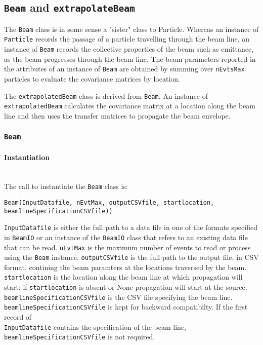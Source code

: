 \subsection{\texttt{Beam} and \texttt{extrapolateBeam}}
\label{SubSect:B}

The \texttt{Beam} class is in some sense a "sister" class to Particle.
Whereas an instance of \texttt{Particle} records the passage of a
particle travelling through the beam line, an instance
of \texttt{Beam} records the collective properties of the beam such as
emittance, as the beam progresses through the beam line.
The beam parameters reported in the attributes of an instance
of \texttt{Beam} are obtained by summing over \texttt{nEvtsMax}
particles to evaluate the covariance matrices by location.

The \texttt{extrapolatedBeam} class is derived from \texttt{Beam}.
An instance of \texttt{extrapolatedBeam} calculates the covariance
matrix at a location along the beam line and then uses the transfer
matrices to propagate the beam envelope.

\subsubsection{\texttt{Beam}}

\paragraph{Instantiation}\mbox{}\\
\noindent
The call to instantiate the \texttt{Beam} class is:
\begin{center}
  \texttt{Beam(InputDatafile, nEvtMax, outputCSVfile,
  startlocation, beamlineSpecificationCSVfile))}
\end{center}
\texttt{InputDatafile} is either the full path to a data file in one
of the formats specified in \texttt{BeamIO} or an instance of
the \texttt{BeamIO} class that refers to an existing data file that
can be read.
\texttt{nEvtMax} is the maximum number of events to read or process
using the \texttt{Beam} instance.
\texttt{outputCSVfile} is the full path to the output file, in CSV
format, contining the beam paramters at the locations traversed by the
beam. 
\texttt{startlocation} is the location along the beam line at which
propagation will start; if \texttt{startlocation} is absent or None
propagation will start at the source.
\texttt{beamlineSpecificationCSVfile} is the CSV file specifying the
beam line. \\
\texttt{beamlineSpecificationCSVfile} is kept for backward
compatibilty.
If the first record of \\
\texttt{InputDatafile} contains the specification of the beam
line, \texttt{beamlineSpecificationCSVfile} is not required. 

